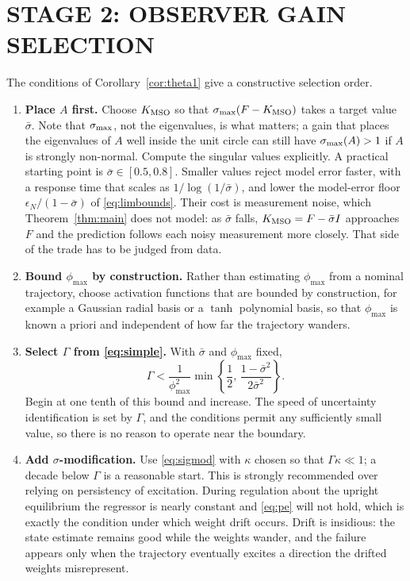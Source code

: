 \section{STAGE 2: OBSERVER GAIN SELECTION}

The conditions of Corollary~\ref{cor:theta1} give a constructive selection
order.

\begin{enumerate}[label=\arabic*.,leftmargin=*]

\item \textbf{Place $A$ first.} Choose $K_{\mathrm{MSO}}$ so that $\sigma_{\max}(F-K_{\mathrm{MSO}})$ takes a
target value $\bar\sigma$. Note that $\sigma_{\max}$, not the eigenvalues, is what
matters; a gain that places the eigenvalues of $A$ well inside the unit circle
can still have $\sigma_{\max}(A)>1$ if $A$ is strongly non-normal. Compute the
singular values explicitly. A practical starting point is
$\bar\sigma\in[0.5,0.8]$. Smaller values reject model error faster, with a
response time that scales as $1/\log(1/\bar\sigma)$, and lower the model-error
floor $\epsilon_N/(1-\bar\sigma)$ of \eqref{eq:limbounds}. Their cost is
measurement noise, which Theorem~\ref{thm:main} does not model: as $\bar\sigma$
falls, $K_{\mathrm{MSO}}=F-\bar\sigma I$ approaches $F$ and the prediction follows each noisy
measurement more closely. That side of the trade has to be judged from data.

\item \textbf{Bound $\phi_{\max}$ by construction.} Rather than estimating
$\phi_{\max}$ from a nominal trajectory, choose activation functions that are
bounded by construction, for example a Gaussian radial basis or a
$\tanh$ polynomial basis, so that $\phi_{\max}$ is known a priori and
independent of how far the trajectory wanders.

\item \textbf{Select $\Gamma$ from \eqref{eq:simple}.} With $\bar\sigma$ and
$\phi_{\max}$ fixed,
\[
\Gamma<\frac{1}{\phi_{\max}^2}\min\left\{\frac{1}{2},\,
\frac{1-\bar\sigma^2}{2\bar\sigma^2}\right\}.
\]
Begin at one tenth of this bound and increase. The speed of uncertainty
identification is set by $\Gamma$, and the conditions permit any sufficiently
small value, so there is no reason to operate near the boundary.

\item \textbf{Add $\sigma$-modification.} Use \eqref{eq:sigmod} with
$\kappa$ chosen so that $\Gamma\kappa\ll1$; a decade below $\Gamma$ is a
reasonable start. This is strongly recommended over relying on persistency
of excitation. During regulation about the upright equilibrium the regressor is
nearly constant and \eqref{eq:pe} will not hold, which is exactly the condition
under which weight drift occurs. Drift is insidious: the state estimate remains
good while the weights wander, and the failure appears only when the trajectory
eventually excites a direction the drifted weights misrepresent.

\end{enumerate}

